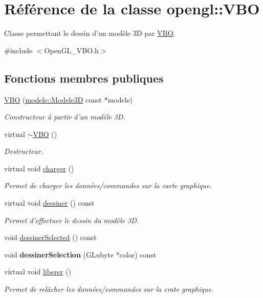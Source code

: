 \hypertarget{classopengl_1_1_v_b_o}{\section{Référence de la classe opengl\-:\-:V\-B\-O}
\label{classopengl_1_1_v_b_o}
}


Classe permettant le dessin d'un modèle 3\-D par \hyperlink{classopengl_1_1_v_b_o}{V\-B\-O}.  




{\ttfamily \#include $<$Open\-G\-L\-\_\-\-V\-B\-O.\-h$>$}

\subsection*{Fonctions membres publiques}
\begin{DoxyCompactItemize}
\item 
\hyperlink{group__modele_ga6fa9de06cf295f987e2022162f1c0d41}{V\-B\-O} (\hyperlink{classmodele_1_1_modele3_d}{modele\-::\-Modele3\-D} const $\ast$modele)
\begin{DoxyCompactList}\small\item\em Constructeur à partir d'un modèle 3\-D. \end{DoxyCompactList}\item 
virtual \hyperlink{group__modele_gafcea85cfc425d9c4720a32a53b720783}{$\sim$\-V\-B\-O} ()
\begin{DoxyCompactList}\small\item\em Destructeur. \end{DoxyCompactList}\item 
virtual void \hyperlink{group__modele_gacecd4cf0a91c2b8b34c193f7801d42ea}{charger} ()
\begin{DoxyCompactList}\small\item\em Permet de charger les données/commandes sur la carte graphique. \end{DoxyCompactList}\item 
virtual void \hyperlink{group__modele_ga41350c248ef222b9cbfb850432abbc53}{dessiner} () const 
\begin{DoxyCompactList}\small\item\em Permet d'effectuer le dessin du modèle 3\-D. \end{DoxyCompactList}\item 
void \hyperlink{group__modele_ga17f25b54d1a61772cf3a3f88a3ce6274}{dessiner\-Selected} () const 
\item 
\hypertarget{group__opengl_gafbabec4454dedc9f18b546f2ea358823}{void {\bfseries dessiner\-Selection} (G\-Lubyte $\ast$color) const }\label{group__opengl_gafbabec4454dedc9f18b546f2ea358823}

\item 
virtual void \hyperlink{group__modele_ga6fd3c8634c2da6d9460aa5d118ac47cd}{liberer} ()
\begin{DoxyCompactList}\small\item\em Permet de relâcher les données/commandes sur la crate graphique. \end{DoxyCompactList}\end{DoxyCompactItemize}


